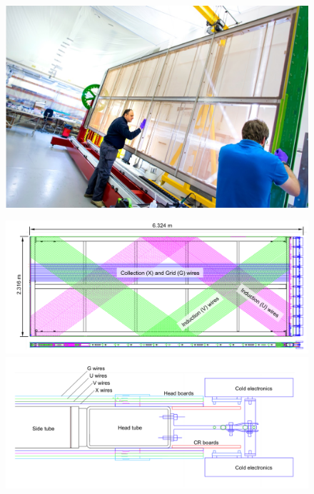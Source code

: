 \begin{figure}
\RawFloats
    \centering
    \begin{minipage}{.47\textwidth}
    \includegraphics[width=\linewidth]{figs/WP3/UKAPA.png}
    \label{fig:CompleteAPA}
    \end{minipage}%
\hspace{0.03\textwidth}
\begin{minipage}{.47\textwidth}
    \centering
    \includegraphics[width=\linewidth]{figs/WP3/WireWindingAngles.png}
    \label{fig:APADiagram}
    \includegraphics[width=\linewidth]{figs/WP3/WireLayers.png}
    \label{fig:APALayers}
    \end{minipage}
\end{figure}

